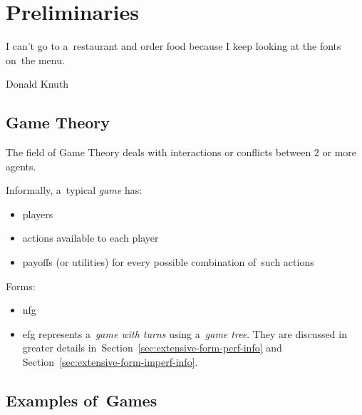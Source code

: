 \chapter{Preliminaries}
\epigraph{
  I can't go to a~restaurant and order food because I keep looking at the fonts on~the menu.
}{Donald Knuth}

\section{Game Theory}
The field of Game Theory deals with interactions or conflicts between $2$ or more agents.
\todo

Informally, a~typical \emph{game} has:
\begin{itemize}
  \item players
  \item actions available to each player
  \item payoffs (or utilities) for every possible combination of~such actions
\end{itemize}

\todo
Forms:
\begin{itemize}
  \item \acrfull{nfg}
  \item \acrfull{efg} represents a~\emph{game with turns} using a~\emph{game tree}.
    They are discussed in greater details in~Section~\ref{sec:extensive-form-perf-info} and Section~\ref{sec:extensive-form-imperf-info}.
\end{itemize}

\section{Examples of~Games}

